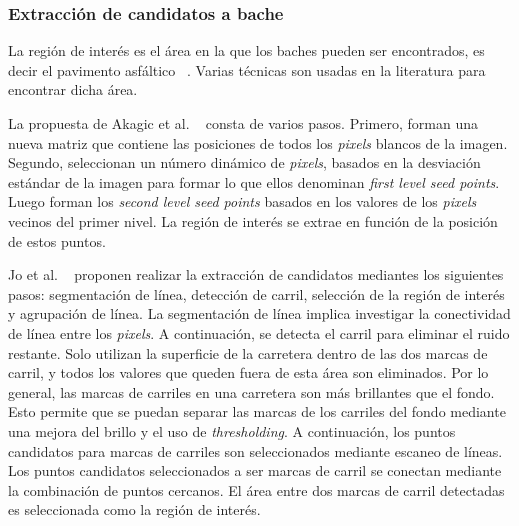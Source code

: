 
		\subsubsection{Extracción de candidatos a bache}
		La región de interés es el área en la que los baches pueden ser encontrados, es decir el pavimento asfáltico ~.
		Varias técnicas son usadas en la literatura para encontrar dicha área. 

		La propuesta de Akagic et al. ~ consta de varios pasos. Primero, forman una nueva matriz que contiene las posiciones 
		de todos los \emph{pixels} blancos de la imagen. Segundo, seleccionan un número dinámico de \emph{pixels}, basados 
		en la desviación estándar de la imagen para formar lo que ellos denominan \emph{first level seed points}. Luego forman  los 
		\emph{second level seed points} basados en los valores de los \emph{pixels} vecinos del primer nivel. La región de
		interés se extrae en función de la posición de estos puntos.
		

		Jo et al. ~ proponen realizar la extracción de candidatos mediantes los siguientes pasos: segmentación de línea, 
		detección de carril, selección de la región de interés y agrupación de línea. La segmentación de línea implica investigar la conectividad 
		de línea entre los \emph{pixels}. A continuación, se detecta el carril para eliminar el ruido restante. Solo utilizan la superficie de la 
		carretera dentro de las dos marcas de carril, y todos los valores que queden fuera de esta área son eliminados. Por lo general, las marcas 
		de carriles en una carretera son más brillantes que el fondo. Esto permite que  se puedan separar las marcas de los carriles del fondo mediante 
		una  mejora del brillo y el uso de \emph{thresholding}. A continuación, los puntos candidatos para marcas de 
		carriles son seleccionados mediante escaneo de líneas. Los puntos candidatos seleccionados a ser marcas de carril 
		se conectan mediante la combinación de puntos cercanos. El área entre dos marcas de carril detectadas es seleccionada como la región de interés. 

